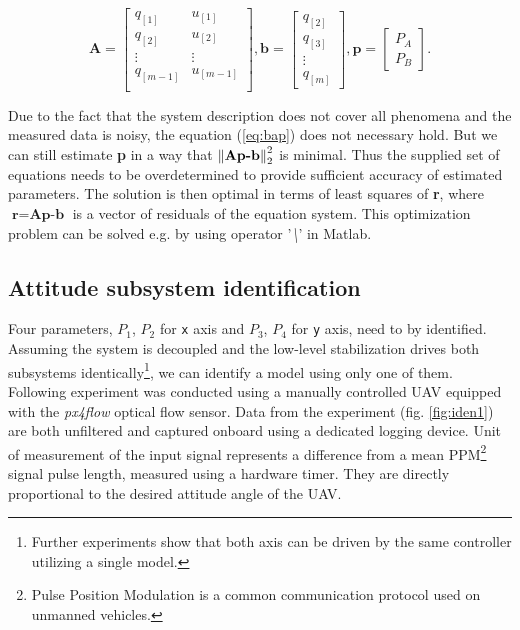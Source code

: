 \begin{equation}
\textbf{A} = \begin{bmatrix}
q_{[1]} & u_{[1]} \\
q_{[2]} & u_{[2]} \\
\vdots & \vdots \\
q_{[m-1]} & u_{[m-1]} \\
\end{bmatrix},
\textbf{b} = \begin{bmatrix}
q_{[2]} \\
q_{[3]} \\
\vdots\\
q_{[m]}
\end{bmatrix},
\textbf{p} = \begin{bmatrix}
P_A \\
P_B
\end{bmatrix}.
\end{equation}

Due to the fact that the system description does not cover all phenomena and the measured data is noisy, the equation (\ref{eq:bap}) does not necessary hold. But we can still estimate \textbf{p} in a way that $\left\lVert\textbf{Ap-b}\right\rVert_2^2$ is minimal. Thus the supplied set of equations needs to be overdetermined to provide sufficient accuracy of estimated parameters. The solution is then optimal in terms of least squares of \textbf{r}, where $\textbf{r} = \textbf{Ap-b}$ is a vector of residuals of the equation system. This optimization problem can be solved e.g. by using operator '\textit{\textbackslash}' in Matlab.

\subsection{Attitude subsystem identification}
\label{cap:attitude_subsystem_identification}

Four parameters, $P_1$, $P_2$ for \texttt{x} axis and $P_3$, $P_4$ for \texttt{y} axis, need to by identified. Assuming the system is decoupled and the low-level stabilization drives both subsystems identically\footnote{Further experiments show that both axis can be driven by the same controller utilizing a single model.}, we can identify a model using only one of them. Following experiment was conducted using a manually controlled UAV equipped with the \textit{px4flow} optical flow sensor. Data from the experiment (fig. \ref{fig:iden1}) are both unfiltered and captured onboard using a dedicated logging device. Unit of measurement of the input signal represents a difference from a mean PPM\footnote{Pulse Position Modulation is a common communication protocol used on unmanned vehicles.} signal pulse length, measured using a hardware timer. They are directly proportional to the desired attitude angle of the UAV.

